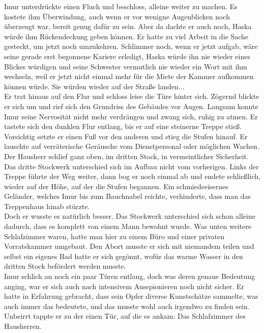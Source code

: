 Imur unterdrückte einen Fluch und beschloss, alleine weiter zu machen. Es kostete ihm Überwindung, 
auch wenn er vor wenigne Augenblicken noch überzeugt war, bereit genug dafür zu sein. Aber da 
dachte er auch noch, Haska würde ihm Rückendeckung geben können. Er hatte zu viel Arbeit in 
die Sache gesteckt, um jetzt noch umzukehren. Schlimmer noch, wenn er jetzt aufgab, wäre seine 
gerade erst begonnene Kariere erledigt, Haska würde ihn nie wieder eines Blickes würdigen und seine 
Schwester vermutlich nie wieder ein Wort mit ihm wechseln, weil er jetzt nicht einmal mehr für die 
Miete der Kammer aufkommen können würde. Sie würden wieder auf der Straße landen...\\
Er trat hinaus auf den Flur und schloss leise die Türe hinter sich. Zögernd blickte er sich um und 
rief sich den Grundriss des Gebäudes vor Augen. Langsam konnte Imur seine Nervosität nicht mehr 
verdrängen und zwang sich, ruhig zu atmen. Er tastete sich den dunklen Flur entlang, bis er auf 
eine steinerne Treppe stieß. Vorsichtig setzte er einen Fuß vor den anderen und stieg die Stufen 
hinauf. Er lauschte auf verräterische Geräusche vom Dienstpersonal oder möglichen Wachen. Der 
Hausherr schlief ganz oben, im dritten Stock, in vermeintlicher Sicherheit.\\
Das dritte Stockwerk unterschied sich im Aufbau nicht vom vorherigen. Links der Treppe führte 
der Weg weiter, dann bog er noch einmal ab und endete schließlich, wieder auf der Höhe, auf der die 
Stufen begannen. Ein schmiedeeisernes Geländer, welches Imur bis zum Bauchnabel reichte, 
verhinderte, dass man das Treppenhaus hinab stürzte.\\
Doch er wusste es natürlich besser. Das Stockwerk unterschied sich schon alleine dadurch, dass es 
komplett von einem Mann bewohnt wurde. Was unten weitere Schlafzimmer waren, hatte man hier zu 
einem Büro und einer privaten Vorratskammer umgebaut. Den Abort musste er sich mit niemandem teilen 
und selbst ein eigenes Bad hatte er sich gegönnt, wofür das warme Wasser in den dritten Stock 
befördert werden musste.\\
Imur schlich an noch ein paar Türen entlang, doch was deren genaue Bedeutung anging, war er sich 
auch nach intensivem Ausspionieren noch nicht sicher. Er hatte in Erfahrung gebracht, dass sein 
Opfer diverse Kunstschätze sammelte, was auch immer das bedeutete, und das musste wohl auch 
irgendwo zu finden sein. \\
Unbeirrt tappte er zu der einen Tür, auf die es ankam: Das Schlafzimmer des Hausherren.\\
